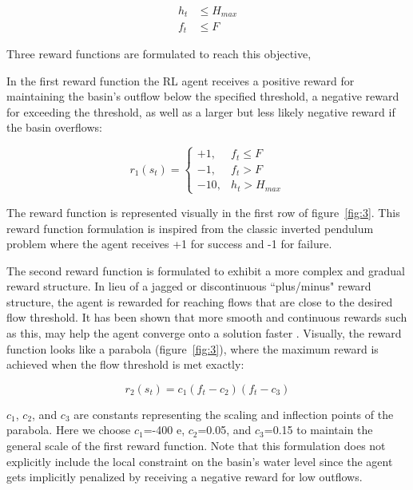 \begin{align}
    h_t &\leq H_{max} \\
    f_t &\leq F
\end{align}

Three reward functions are formulated to reach this objective, 


In the first reward function the RL agent receives a positive reward for maintaining the basin’s outflow below the specified threshold, a negative reward for exceeding the threshold, as well as a larger but less likely negative reward if the basin overflows:

\begin{equation}
r_1 (s_t )= \begin{cases}
		+1, & f_t \leq F\\
		-1, & f_t > F\\
		-10,& h_t > H_{max}
	\end{cases}
\end{equation}

The reward function is represented visually in the first row of figure~\ref{fig:3}.
This reward function formulation is inspired from the classic inverted pendulum problem \cite{Watkins1992Q-learning} where the agent receives +1 for success and -1 for failure.


The second reward function is formulated to exhibit a more complex and gradual reward structure.
In lieu of a jagged or discontinuous ``plus/minus" reward structure, the agent is rewarded for reaching flows that are close to the desired flow threshold.
It has been shown that more smooth and continuous rewards such as this, may help the agent converge onto a solution faster \cite{Sutton98, aytar2018playing}.
Visually, the reward function looks like a parabola (figure~\ref{fig:3}), where the maximum reward is achieved when the flow threshold is met exactly:

\begin{equation}
r_2 (s_t )= c_1 (f_t-c_2 )(f_t- c_3 )
\end{equation}

$c_1$, $c_2$, and $c_3$ are constants representing the scaling and inflection points of the parabola.
Here we choose $c_1$=-400 e, $c_2$=0.05, and $c_3$=0.15 to maintain the general scale of the first reward function.
Note that this formulation does not explicitly include the local constraint on the basin’s water level since the agent gets implicitly penalized by receiving a negative reward for low outflows.

